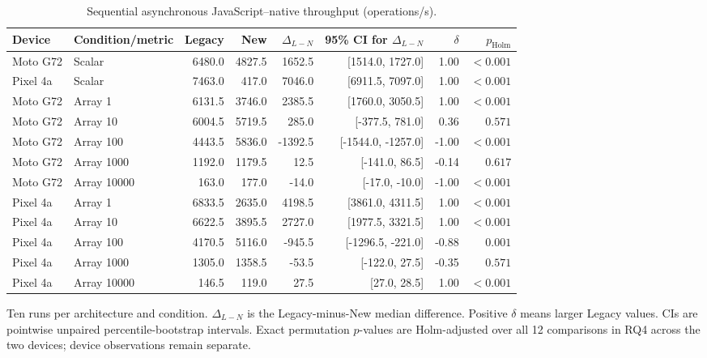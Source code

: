 \begin{table}[!t]
\centering
\caption{Sequential asynchronous JavaScript--native throughput (operations/s).}
\label{tab:s4}
\small\setlength{\tabcolsep}{5pt}
\begin{tabular}{llrrrrrr}
\toprule
Device & Condition/metric & Legacy & New & $\Delta_{L-N}$ & 95\% CI for $\Delta_{L-N}$ & $\delta$ & $p_{\mathrm{Holm}}$ \\
\midrule
Moto G72 & Scalar & 6480.0 & 4827.5 & 1652.5 & [1514.0, 1727.0] & 1.00 & $<0.001$ \\
Pixel 4a & Scalar & 7463.0 & 417.0 & 7046.0 & [6911.5, 7097.0] & 1.00 & $<0.001$ \\
Moto G72 & Array 1 & 6131.5 & 3746.0 & 2385.5 & [1760.0, 3050.5] & 1.00 & $<0.001$ \\
Moto G72 & Array 10 & 6004.5 & 5719.5 & 285.0 & [-377.5, 781.0] & 0.36 & $0.571$ \\
Moto G72 & Array 100 & 4443.5 & 5836.0 & -1392.5 & [-1544.0, -1257.0] & -1.00 & $<0.001$ \\
Moto G72 & Array 1000 & 1192.0 & 1179.5 & 12.5 & [-141.0, 86.5] & -0.14 & $0.617$ \\
Moto G72 & Array 10000 & 163.0 & 177.0 & -14.0 & [-17.0, -10.0] & -1.00 & $<0.001$ \\
Pixel 4a & Array 1 & 6833.5 & 2635.0 & 4198.5 & [3861.0, 4311.5] & 1.00 & $<0.001$ \\
Pixel 4a & Array 10 & 6622.5 & 3895.5 & 2727.0 & [1977.5, 3321.5] & 1.00 & $<0.001$ \\
Pixel 4a & Array 100 & 4170.5 & 5116.0 & -945.5 & [-1296.5, -221.0] & -0.88 & $0.001$ \\
Pixel 4a & Array 1000 & 1305.0 & 1358.5 & -53.5 & [-122.0, 27.5] & -0.35 & $0.571$ \\
Pixel 4a & Array 10000 & 146.5 & 119.0 & 27.5 & [27.0, 28.5] & 1.00 & $<0.001$ \\
\bottomrule
\end{tabular}
\par\smallskip
\begin{minipage}{0.98\textwidth}\footnotesize
Ten runs per architecture and condition. $\Delta_{L-N}$ is the Legacy-minus-New median difference. Positive $\delta$ means larger Legacy values. CIs are pointwise unpaired percentile-bootstrap intervals. Exact permutation $p$-values are Holm-adjusted over all 12 comparisons in RQ4 across the two devices; device observations remain separate.
\end{minipage}
\end{table}
